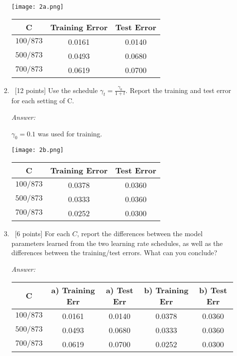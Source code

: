 \documentclass[12pt, fullpage,letterpaper]{article}
\begin{document}
\begin{enumerate}
\begin{enumerate}
		\begin{center}
			\texttt{[image: 2a.png]}
		\end{center}

		\begin{center}
		\begin{tabular}{|c|c|c|}
			\hline
			C & Training Error & Test Error \\
			\hline
			$100/873$ & 0.0161 & 0.0140 \\
			\hline
			$500/873$ & 0.0493 & 0.0680 \\
			\hline
			$700/873$ & 0.0619 & 0.0700 \\
			\hline
		\end{tabular}
		\end{center}


		\item~[12 points] Use the schedule $\gamma_t = \frac{\gamma_0}{1+t}$. Report the training and test error for each setting of C. 

		\textit{Answer:}
		
		$\gamma_0 = 0.1$ was used for training.

		\begin{center}
			\texttt{[image: 2b.png]}
		\end{center}

		\begin{center}
		\begin{tabular}{|c|c|c|}
			\hline
			C & Training Error & Test Error \\
			\hline
			$100/873$ & 0.0378 & 0.0360 \\
			\hline
			$500/873$ & 0.0333 & 0.0360 \\
			\hline
			$700/873$ & 0.0252 & 0.0300 \\
			\hline
		\end{tabular}
		\end{center}

		\item~[6 points] For each $C$, report the differences between the model parameters learned from the two learning rate schedules, as well as the differences between the training/test errors. What can you conclude? 

		\textit{Answer:}

		\begin{center}
		\begin{tabular}{|c|c|c|c|c|}
			\hline
			C & a) Training Err & a) Test Err & b) Training Err & b) Test Err \\
			\hline
			$100/873$ & 0.0161 & 0.0140 & 0.0378 & 0.0360 \\
			\hline
			$500/873$ & 0.0493 & 0.0680 & 0.0333 & 0.0360 \\
			\hline
			$700/873$ & 0.0619 & 0.0700 & 0.0252 & 0.0300 \\
			\hline


\end{tabular}
\end{center}
\end{enumerate}
\end{enumerate}
\end{document}
